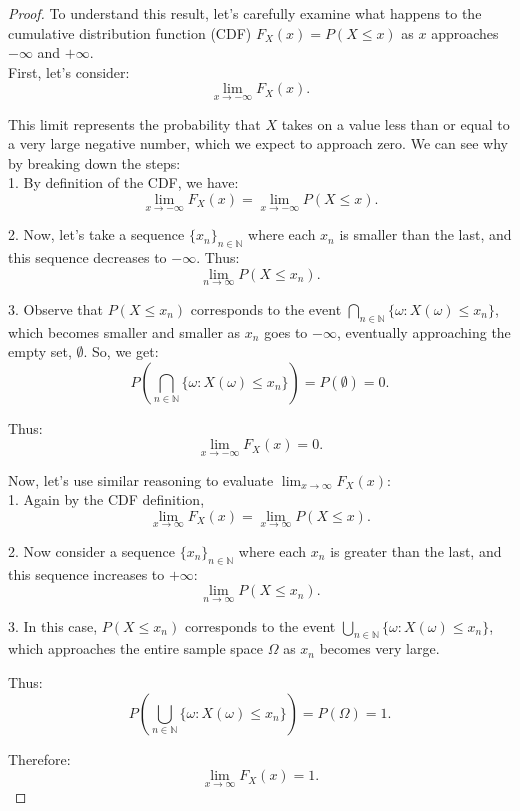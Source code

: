 \begin{proof}
To understand this result, let's carefully examine what happens to the cumulative distribution function (CDF) \( F_X(x) = P(X \leq x) \) as \( x \) approaches \( -\infty \) and \( +\infty \).\\

First, let's consider:
\[
\lim_{x \to -\infty} F_X(x).
\]

This limit represents the probability that \( X \) takes on a value less than or equal to a very large negative number, which we expect to approach zero. We can see why by breaking down the steps:\\

1. By definition of the CDF, we have:
   \[
   \lim_{x \to -\infty} F_X(x) = \lim_{x \to -\infty} P(X \leq x).
   \]

2. Now, let's take a sequence \( \{ x_n \}_{n \in \mathbb{N}} \) where each \( x_n \) is smaller than the last, and this sequence decreases to \( -\infty \). Thus:
   \[
   \lim_{n \to \infty} P(X \leq x_n).
   \]

3. Observe that \( P(X \leq x_n) \) corresponds to the event \(\bigcap_{n \in \mathbb{N}} \{ \omega : X(\omega) \leq x_n \} \), which becomes smaller and smaller as \( x_n \) goes to \( -\infty \), eventually approaching the empty set, \(\emptyset\). So, we get:
   \[
   P\left( \bigcap_{n \in \mathbb{N}} \{ \omega : X(\omega) \leq x_n \} \right) = P(\emptyset) = 0.
   \]

Thus:
\[
\lim_{x \to -\infty} F_X(x) = 0.
\]

Now, let's use similar reasoning to evaluate \( \lim_{x \to \infty} F_X(x) \):\\

1. Again by the CDF definition,
   \[
   \lim_{x \to \infty} F_X(x) = \lim_{x \to \infty} P(X \leq x).
   \]

2. Now consider a sequence \( \{ x_n \}_{n \in \mathbb{N}} \) where each \( x_n \) is greater than the last, and this sequence increases to \( +\infty \):
   \[
   \lim_{n \to \infty} P(X \leq x_n).
   \]

3. In this case, \( P(X \leq x_n) \) corresponds to the event \(\bigcup_{n \in \mathbb{N}} \{ \omega : X(\omega) \leq x_n \}\), which approaches the entire sample space \(\Omega\) as \( x_n \) becomes very large.

Thus:
\[
P\left( \bigcup_{n \in \mathbb{N}} \{ \omega : X(\omega) \leq x_n \} \right) = P(\Omega) = 1.
\]

Therefore:
\[
\lim_{x \to \infty} F_X(x) = 1.
\]
\end{proof}

